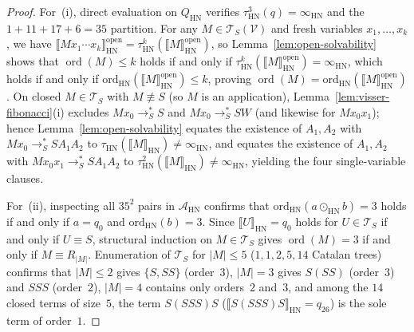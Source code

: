 \documentclass[11pt,reqno]{amsart}
\numberwithin{equation}{section}
\theoremstyle{plain}
\theoremstyle{definition}
\theoremstyle{remark}
\DeclareMathOperator{\ord}{ord}
\newcommand{\TS}{\mathcal{T}_S}
\newcommand{\TSV}{\mathcal{T}_S(\mathcal{V})}
\newcommand{\HN}{\mathrm{HN}}
\newcommand{\sem}[1]{\llbracket #1 \rrbracket}
\newcommand{\redSs}{\to_S^*}
\begin{document}
\begin{proof}
For~(i), direct evaluation on $Q_{\HN}$ verifies $\tau_{\HN}^3(q) = \infty_{\HN}$ and the $1 + 11 + 17 + 6 = 35$ partition. For any $M \in \TSV$ and fresh variables $x_1, \dots, x_k$, we have $\sem{M x_1 \cdots x_k}_{\HN}^{\mathrm{open}} = \tau_{\HN}^k(\sem{M}_{\HN}^{\mathrm{open}})$, so Lemma~\ref{lem:open-solvability} shows that $\ord(M) \le k$ holds if and only if $\tau_{\HN}^k(\sem{M}_{\HN}^{\mathrm{open}}) = \infty_{\HN}$, which holds if and only if $\mathrm{ord}_{\HN}(\sem{M}_{\HN}^{\mathrm{open}}) \le k$, proving $\ord(M) = \mathrm{ord}_{\HN}(\sem{M}_{\HN}^{\mathrm{open}})$. On closed $M \in \TS$ with $M \not\equiv S$ (so $M$ is an application), Lemma~\ref{lem:visser-fibonacci}(i) excludes $M x_0 \redSs S$ and $M x_0 \redSs S W$ (and likewise for $M x_0 x_1$); hence Lemma~\ref{lem:open-solvability} equates the existence of $A_1, A_2$ with $M x_0 \redSs S A_1 A_2$ to $\tau_{\HN}(\sem{M}_{\HN}) \neq \infty_{\HN}$, and equates the existence of $A_1, A_2$ with $M x_0 x_1 \redSs S A_1 A_2$ to $\tau_{\HN}^2(\sem{M}_{\HN}) \neq \infty_{\HN}$, yielding the four single-variable clauses.

For~(ii), inspecting all $35^2$ pairs in $\mathcal{A}_{\HN}$ confirms that $\mathrm{ord}_{\HN}(a \odot_{\HN} b) = 3$ holds if and only if $a = q_0$ and $\mathrm{ord}_{\HN}(b) = 3$. Since $\sem{U}_{\HN} = q_0$ holds for $U \in \TS$ if and only if $U \equiv S$, structural induction on $M \in \TS$ gives $\ord(M) = 3$ if and only if $M \equiv R_{|M|}$. Enumeration of $\TS$ for $|M| \le 5$ ($1, 1, 2, 5, 14$ Catalan trees) confirms that $|M| \le 2$ gives $\{S, S S\}$ (order~$3$), $|M| = 3$ gives $S(S S)$ (order~$3$) and $S S S$ (order~$2$), $|M| = 4$ contains only orders~$2$ and~$3$, and among the $14$ closed terms of size~$5$, the term $S(S S S)S$ ($\sem{S(S S S)S}_{\HN} = q_{26}$) is the sole term of order~$1$.


\end{proof}
\end{document}
